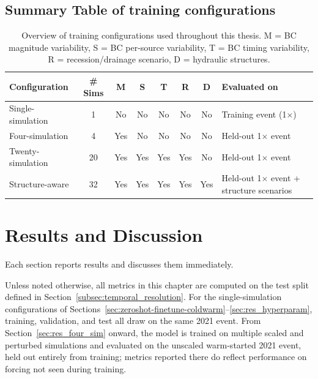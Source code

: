 \documentclass[12pt,a4paper]{report}
\begin{document}
{\section{Summary Table of training configurations}

\begin{table}[H]
    \centering
    \caption{Overview of training configurations used throughout this thesis.
    M = BC magnitude variability, S = BC per-source variability, T = BC timing
    variability, R = recession/drainage scenario, D = hydraulic structures.}
    \label{tab:training_configs_overview}
    \begin{tabular}{lccccccl}
        \toprule
        \textbf{Configuration} & \textbf{\# Sims} & \textbf{M} & \textbf{S} & \textbf{T} & \textbf{R} & \textbf{D} & \textbf{Evaluated on} \\
        \midrule
        Single-simulation & 1  & No  & No  & No  & No  & No  & Training event (1$\times$) \\
        Four-simulation   & 4  & Yes & No  & No  & No  & No  & Held-out 1$\times$ event \\
        Twenty-simulation & 20 & Yes & Yes & Yes & Yes & No  & Held-out 1$\times$ event \\
        Structure-aware   & 32 & Yes & Yes & Yes & Yes & Yes & \shortstack{Held-out 1$\times$ event\\+ structure scenarios} \\
        \bottomrule
    \end{tabular}
\end{table}

 
\chapter{Results and Discussion}
\label{ch:results}
 
Each section reports results and discusses them immediately.
 
Unless noted otherwise, all metrics in this chapter are computed on the test split
defined in Section~\ref{subsec:temporal_resolution}. For the single-simulation
configurations of Sections~\ref{sec:zeroshot-finetune-coldwarm}--\ref{sec:res_hyperparam},
training, validation, and test all draw on the same 2021 event. From
Section~\ref{sec:res_four_sim} onward, the model is trained on multiple scaled and
perturbed simulations and evaluated on the unscaled warm-started 2021
event, held out entirely from training; metrics reported there do reflect performance
on forcing not seen during training.
 
}
\end{document}
